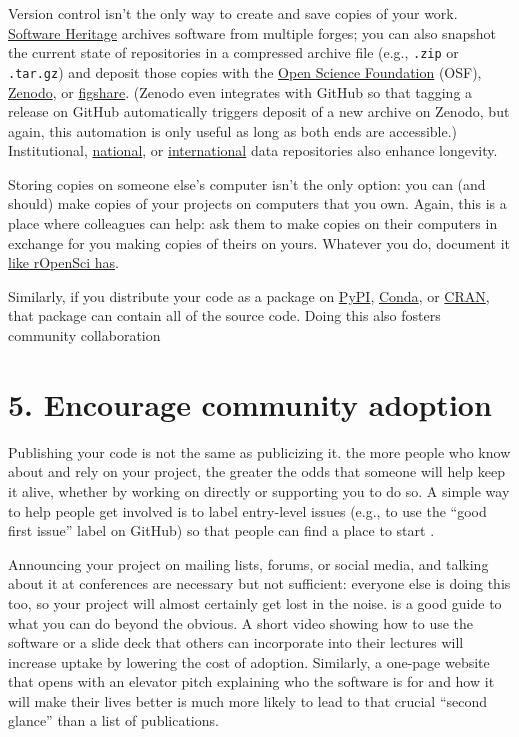 \documentclass[10pt,letterpaper]{article}
\begin{document}
Version control isn't the only way to create and save copies of your work.
\href{https://www.softwareheritage.org/how-to-archive-reference-code/}{Software Heritage} archives software from multiple forges;
you can also snapshot the current state of repositories in a compressed archive file
(e.g., \texttt{.zip} or \texttt{.tar.gz})
and deposit those copies with the \href{https://osf.io/}{Open Science Foundation} (OSF),
\href{https://zenodo.org/}{Zenodo},
or \href{https://figshare.com/}{figshare}.
(Zenodo even integrates with GitHub so that tagging a release on GitHub
automatically triggers deposit of a new archive on Zenodo,
but again,
this automation is only useful as long as both ends are accessible.)
Institutional,
\href{https://amt.coretrustseal.org/certificates/}{national},
or \href{https://safeguar.de/}{international} data repositories also enhance longevity.

Storing copies on someone else's computer isn't the only option:
you can (and should) make copies of your projects on computers that you own.
Again,
this is a place where colleagues can help:
ask them to make copies on their computers in exchange for you making copies of theirs on yours.
Whatever you do,
document it \href{https://ropensci.org/blog/2022/03/22/safeguards-and-backups-for-github-organizations/}{like rOpenSci has}.

Similarly,
if you distribute your code as a package on \href{https://pypi.org/}{PyPI},
\href{https://anaconda.org/anaconda/conda}{Conda},
or \href{https://cran.r-project.org/}{CRAN},
that package can contain all of the source code.
Doing this also fosters community collaboration

\section*{5. Encourage community adoption}

Publishing your code is not the same as publicizing it.
the more people who know about and rely on your project,
the greater the odds that someone will help keep it alive,
whether by working on directly or supporting you to do so.
A simple way to help people get involved is to label entry-level issues
(e.g., to use the ``good first issue'' label on GitHub)
so that people can find a place to start \cite{SteinmacherXXXX}.

Announcing your project on mailing lists, forums, or social media,
and talking about it at conferences are necessary but not sufficient:
everyone else is doing this too,
so your project will almost certainly get lost in the noise.
\cite{Kuchner2011} is a good guide to what you can do beyond the obvious.
A short video showing how to use the software
or a slide deck that others can incorporate into their lectures
will increase uptake by lowering the cost of adoption.
Similarly,
a one-page website that opens with an elevator pitch
explaining who the software is for
and how it will make their lives better
is much more likely to lead to that crucial ``second glance''
than a list of publications.
\end{document}

